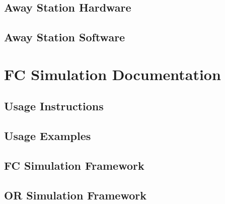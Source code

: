 \documentclass{amsdtx}
\begin{document}
\subsection{Away Station Hardware}
\subsection{Away Station Software}
\newpage\section{FC Simulation Documentation}
\subsection{Usage Instructions}
\subsection{Usage Examples}
\subsection{FC Simulation Framework}
\subsection{OR Simulation Framework}
\end{document}
